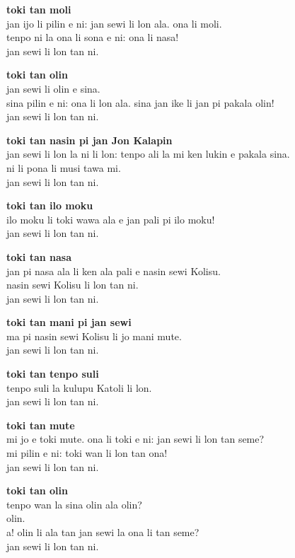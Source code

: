 \textbf{toki tan moli}   \\
jan ijo li pilin e ni: jan sewi li lon ala. ona li moli.   \\
tenpo ni la ona li sona e ni: ona li nasa!   \\
jan sewi li lon tan ni.

\textbf{toki tan olin}   \\
jan sewi li olin e sina.   \\
sina pilin e ni: ona li lon ala. sina jan ike li jan pi pakala olin!   \\
jan sewi li lon tan ni.

\textbf{toki tan nasin pi jan Jon Kalapin}    \\
jan sewi li lon la ni li lon: tenpo ali la mi ken lukin e pakala sina.   \\
ni li pona li musi tawa mi.   \\
jan sewi li lon tan ni.

\textbf{toki tan ilo moku}   \\
ilo moku li toki wawa ala e jan pali pi ilo moku!   \\
jan sewi li lon tan ni.

\textbf{toki tan nasa}   \\
jan pi nasa ala li ken ala pali e nasin sewi Kolisu.   \\
nasin sewi Kolisu li lon tan ni.   \\
jan sewi li lon tan ni.

\textbf{toki tan mani pi jan sewi}   \\
ma pi nasin sewi Kolisu li jo mani mute.   \\
jan sewi li lon tan ni.

\textbf{toki tan tenpo suli}   \\
tenpo suli la kulupu Katoli li lon.   \\
jan sewi li lon tan ni.

\textbf{toki tan mute}   \\
mi jo e toki mute. ona li toki e ni: jan sewi li lon tan seme?   \\
mi pilin e ni: toki wan li lon tan ona!   \\
jan sewi li lon tan ni.

\textbf{toki tan olin}   \\
tenpo wan la sina olin ala olin?   \\
olin.   \\
a! olin li ala tan jan sewi la ona li tan seme?   \\
jan sewi li lon tan ni.

